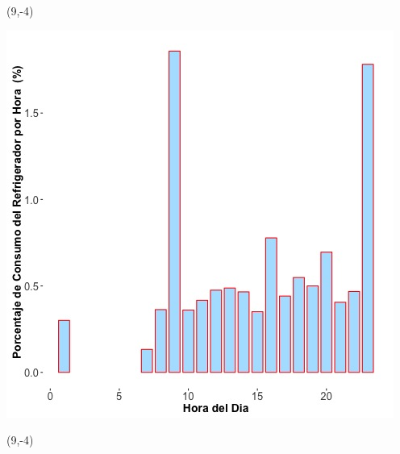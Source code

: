 \documentclass{article}\usepackage[]{graphicx}\usepackage[]{color}
\newenvironment{knitrout}{}{} %
\begin{document}
 \begin{textblock}{1}(9,-4)
\begin{minipage}{20em}
\begingroup

\endgroup
\end{minipage}
\end{textblock}

 \vspace{2cm}

\begin{knitrout}
\color{fgcolor}
\includegraphics[scale=0.65]{figure/A21_fridge_energy_pct.jpg} 
\end{knitrout}

 \begin{textblock}{1}(9,-4)
\begin{minipage}{20em}
\begingroup

\endgroup
\end{minipage}
\end{textblock}
\end{document}

